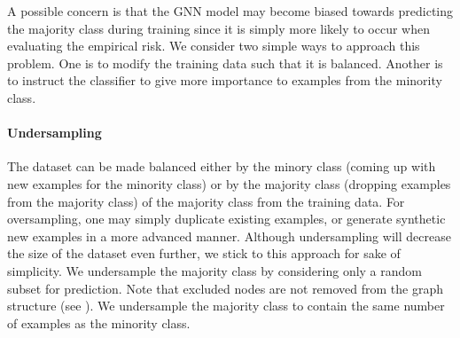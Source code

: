 \documentclass[
	fontsize=10pt, %
	twoside=false, %
	secnumdepth=1, %
  toc=indentunnumbered %
]{kaobook}
\begin{document}
A possible concern is that the GNN model may become biased towards predicting
the majority class during training since it is simply more likely to occur when
evaluating the empirical risk.
%
We consider two simple ways to approach this problem. One is to modify the
training data such that it is balanced. Another is to instruct the classifier to
give more importance to examples from the minority class.



\paragraph{Undersampling}
The dataset can be made balanced 
either by  the minory class (coming up with new examples for
the minority class) or by  the majority class (dropping
examples from the majority class) of the majority class from the training data.
For oversampling, one may simply duplicate existing examples, or generate
synthetic new examples in a more advanced manner. Although undersampling will
decrease the size of the dataset even further, we stick to this approach for
sake of simplicity.
%
We undersample the majority class by considering only a random subset for
prediction. Note that excluded nodes are not removed from the graph structure (see
). We undersample the majority class to contain
the same number of examples as the minority class.


\end{document}
